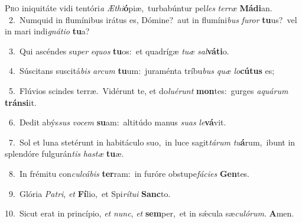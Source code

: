 \lettrine{\initial\textcolor{\initialcolor}{P}}{ro} iniquitáte vidi tentóri\textit{a} \textit{Æ}\-\textit{thi}\textbf{ó}piæ,~\star turbabúntur pel\textit{les} \textit{ter}\-\textit{ræ} \textbf{Má}\-\textbf{di}an.\\
{\numbfont\textcolor{\numbcolor}{~2.}}~Numquid in flumínibus irátus es, Dómine?~\dagger aut in flumíni\textit{bus} \textit{fu}\-\textit{ror} \textbf{tu}\-us?~\star vel in mari indi\-\textit{gná}\-\textit{ti}\textit{o} \textbf{tu}\-a?\par
{\numbfont\textcolor{\numbcolor}{~3.}}~Qui ascéndes su\textit{per} \textit{e}\-\textit{quos} \textbf{tu}\-os:~\star et quadrígæ \textit{tu}\-\textit{æ} \textit{sal}\-\textbf{vá}\textbf{ti}o.\par
{\numbfont\textcolor{\numbcolor}{~4.}}~Súscitans suscitá\textit{bis} \textit{ar}\-\textit{cum} \textbf{tu}\-um:~\star juraménta tríbu\textit{bus} \textit{quæ} \textit{lo}\-\textbf{cú}\textbf{tus} es;\par
{\numbfont\textcolor{\numbcolor}{~5.}}~Flúvios scindes terræ.~\dagger Vidérunt te, et do\-\textit{lu}\-\textit{é}\textit{runt} \textbf{mon}\-tes:~\star gurges \textit{a}\-\textit{quá}\textit{rum} \textbf{tráns}\-\textbf{i}it.\par
{\numbfont\textcolor{\numbcolor}{~6.}}~Dedit abýs\textit{sus} \textit{vo}\-\textit{cem} \textbf{su}\-am:~\star altitúdo manus \textit{su}\-\textit{as} \textit{le}\-\textbf{vá}vit.\par
{\numbfont\textcolor{\numbcolor}{~7.}}~Sol et luna stetérunt in habitáculo suo,~\dagger in luce sagit\-\textit{tá}\-\textit{rum} \textit{tu}\-\textbf{á}rum,~\star ibunt in splendóre fulgurán\textit{tis} \textit{has}\-\textit{tæ} \textbf{tu}\-æ.\par
{\numbfont\textcolor{\numbcolor}{~8.}}~In frémitu con\-\textit{cul}\-\textit{cá}\textit{bis} \textbf{ter}\-ram:~\star in furóre obstupe\-\textit{fá}\-\textit{ci}\textit{es} \textbf{Gen}\-tes.\par
{\numbfont\textcolor{\numbcolor}{~9.}}~Glória \textit{Pa}\-\textit{tri}, \textit{et} \textbf{Fí}\-lio,~\star et Spi\-\textit{rí}\-\textit{tu}\textit{i} \textbf{Sanc}\-to.\par
{\numbfont\textcolor{\numbcolor}{10.}}~Sicut erat in princípio, \textit{et} \textit{nunc}\-, \textit{et} \textbf{sem}\-per,~\star et in sǽcula sæ\-\textit{cu}\-\textit{ló}\textit{rum}. \textbf{A}\-men.\par
